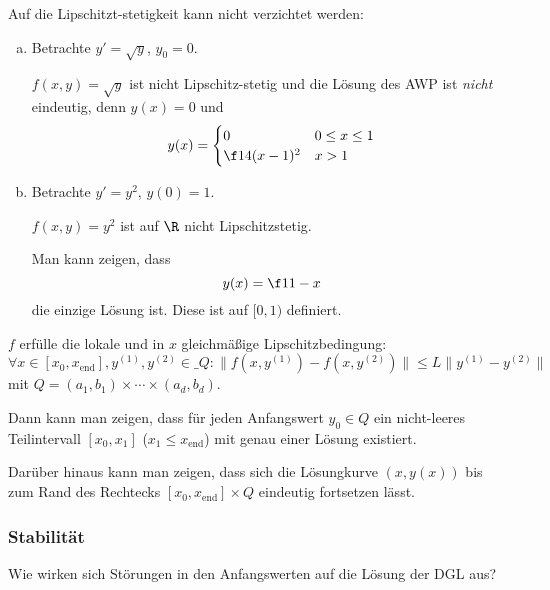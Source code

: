 \documentclass[
]{mycourse}
\begin{document}
\begin{ex} \label{1.10}
	Auf die Lipschitzt-stetigkeit kann nicht verzichtet werden:
	\begin{enumerate}[a)]
		\item
			Betrachte $y' = \sqrt y$, $y_0 = 0$.

			$f(x,y) = \sqrt y$ ist nicht Lipschitz-stetig und die Lösung des AWP ist \emph{nicht} eindeutig, denn
			$y(x) = 0$ und 
			\[
				y(x) = \begin{cases}
					0 & 0\le x \le 1 \\
					\f 14(x-1)^2 & x > 1
				\end{cases}
			\]
		\item
			Betrachte $y' = y^2$, $y(0) = 1$.

			$f(x,y) = y^2$ ist auf $\R$ nicht Lipschitzstetig.

			Man kann zeigen, dass
			\[
				y(x) = \f 1{1-x}
			\]
			die einzige Lösung ist.
			Diese ist auf $[0,1)$ definiert.
	\end{enumerate}
\end{ex}

\begin{nt} \label{1.11}
	$f$ erfülle die lokale und in $x$ gleichmäßige Lipschitzbedingung:
	\[
		\forall x \in [x_0, x_{\text{end}}], y^{(1)}, y^{(2)} \in \_Q :
		\Big\| f(x,y^{(1)}) - f(x,y^{(2)}) \Big\| \le L \|y^{(1)} - y^{(2)}\|
	\]
	mit $Q = (a_1,b_1) \times \dotsb \times (a_d, b_d)$.

	Dann kann man zeigen, dass für jeden Anfangswert $y_0 \in Q$ ein nicht-leeres Teilintervall $[x_0, x_1]$ ($x_1 \le x_{\text{end}}$) mit genau einer Lösung existiert.

	Darüber hinaus kann man zeigen, dass sich die Lösungkurve $(x,y(x))$ bis zum Rand des Rechtecks $[x_0,x_{\text{end}}]\times Q$ eindeutig fortsetzen lässt.
\end{nt}


\subsubsection{Stabilität}


Wie wirken sich Störungen in den Anfangswerten auf die Lösung der DGL aus?
\end{document}
